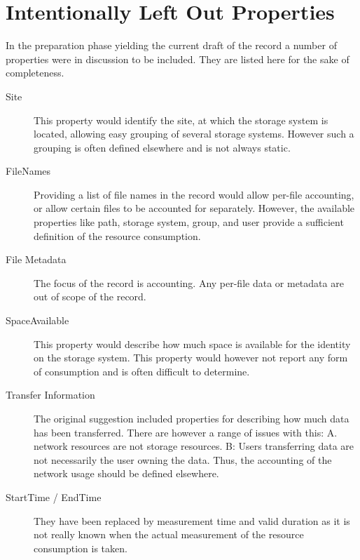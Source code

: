 \section{Intentionally Left Out Properties}

In the preparation phase yielding the current draft of the record a number of
properties were in discussion to be included. They are listed here for the sake 
of completeness.

\begin{description}

\item[Site] This property would identify the site, at which the storage system
is located, allowing easy grouping of several storage systems. However such a
grouping is often defined elsewhere and is not always static.

\item[FileNames] Providing a list of file names in the record would allow
per-file accounting, or allow certain files to be accounted for separately.
However, the available properties like path, storage system, group, and 
user provide a sufficient definition of the resource consumption.

\item[File Metadata] The focus of the record is accounting. Any per-file data
or metadata are out of scope of the record.

\item[SpaceAvailable] This property would describe how much space is available
for the identity on the storage system. This property would however not report
any form of consumption and is often difficult to determine.

\item[Transfer Information] The original suggestion included properties for
describing how much data has been transferred. There are however a range of
issues with this: A. network resources are not storage resources. B: Users
transferring data are not necessarily the user owning the data. Thus, the  
accounting of the network usage should be defined elsewhere.

\item[StartTime / EndTime] They have been replaced by measurement time and 
valid duration as it is not really known when the actual measurement of the 
resource consumption is taken.

\end{description}


